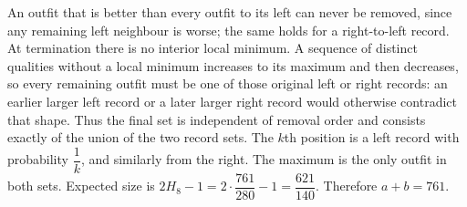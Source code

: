 An outfit that is better than every outfit to its left can never be removed, since any remaining left neighbour is worse; the same holds for a right-to-left record. At termination there is no interior local minimum. A sequence of distinct qualities without a local minimum increases to its maximum and then decreases, so every remaining outfit must be one of those original left or right records: an earlier larger left record or a later larger right record would otherwise contradict that shape. Thus the final set is independent of removal order and consists exactly of the union of the two record sets. The $k$th position is a left record with probability $\dfrac{1}{k}$, and similarly from the right. The maximum is the only outfit in both sets. Expected size is $2H_8-1=2\cdot\dfrac{761}{280}-1=\dfrac{621}{140}$. Therefore $\boxed{a+b=761}$.
